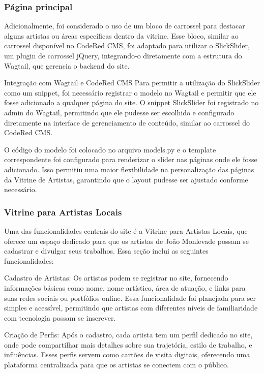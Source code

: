 \subsubsection{Página principal}

Adicionalmente, foi considerado o uso de um bloco de carrossel para destacar alguns artistas ou áreas específicas dentro da vitrine. Esse bloco, similar ao carrossel disponível no CodeRed CMS, foi adaptado para utilizar o SlickSlider, um plugin de carrossel jQuery, integrando-o diretamente com a estrutura do Wagtail, que gerencia o backend do site.

Integração com Wagtail e CodeRed CMS
Para permitir a utilização do SlickSlider como um snippet, foi necessário registrar o modelo no Wagtail e permitir que ele fosse adicionado a qualquer página do site. O snippet SlickSlider foi registrado no admin do Wagtail, permitindo que ele pudesse ser escolhido e configurado diretamente na interface de gerenciamento de conteúdo, similar ao carrossel do CodeRed CMS.

O código do modelo foi colocado no arquivo models.py e o template correspondente foi configurado para renderizar o slider nas páginas onde ele fosse adicionado. Isso permitiu uma maior flexibilidade na personalização das páginas da Vitrine de Artistas, garantindo que o layout pudesse ser ajustado conforme necessário.

\subsubsection{Vitrine para Artistas Locais}

Uma das funcionalidades centrais do site é a Vitrine para Artistas Locais, que oferece um espaço dedicado para que os artistas de João Monlevade possam se cadastrar e divulgar seus trabalhos. Essa seção inclui as seguintes funcionalidades:

Cadastro de Artistas: Os artistas podem se registrar no site, fornecendo informações básicas como nome, nome artístico, área de atuação, e links para suas redes sociais ou portfólios online. Essa funcionalidade foi planejada para ser simples e acessível, permitindo que artistas com diferentes níveis de familiaridade com tecnologia possam se inscrever.

Criação de Perfis: Após o cadastro, cada artista tem um perfil dedicado no site, onde pode compartilhar mais detalhes sobre sua trajetória, estilo de trabalho, e influências. Esses perfis servem como cartões de visita digitais, oferecendo uma plataforma centralizada para que os artistas se conectem com o público.

